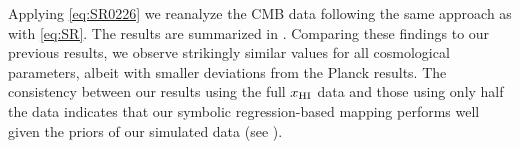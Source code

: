 Applying \cref{eq:SR0226} we reanalyze the CMB data following the
same approach as with \cref{eq:SR}.
The results are summarized in .
Comparing these findings to our previous results, we observe strikingly
similar values for all cosmological parameters, albeit with smaller
deviations from the Planck results.
The consistency between our results using the full $x_{\mathrm{HI}}$ data and
those using only half the data indicates that our symbolic
regression-based mapping performs well given the priors of our simulated
data (see ).
